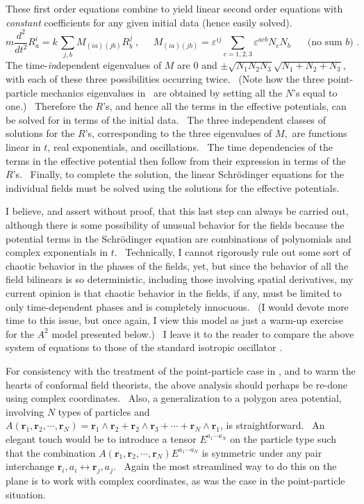 \documentclass[a4paper,12pt]{article}%
\begin{document}
These first order equations combine to yield linear second order equations
with \emph{constant} coefficients for any given initial data (hence easily
solved).%
\[
m\frac{d^{2}}{dt^{2}}R_{a}^{i}=k\,\sum_{j,b}M_{\left(  ia\right)  \left(
jb\right)  }R_{b}^{j}\;,\;\;\;\;\;M_{\left(  ia\right)  \left(  jb\right)
}=\varepsilon^{ij}\sum_{c=1,2,3}\varepsilon^{acb}N_{c}N_{b}%
\;\;\;\;\;\text{\ (no sum }b\text{)\ .}%
\]
The time-\emph{in}dependent eigenvalues of $M$ are $0$ and $\pm\sqrt
{N_{1}N_{2}N_{3}}\sqrt{N_{1}+N_{2}+N_{3}}$, with each of these three
possibilities occurring twice. \ (Note how the three point-particle mechanics
eigenvalues in \cite{CPZ}\ are obtained by setting all the $N$'s equal to
one.) \ Therefore the $R$'s, and hence all the terms in the effective
potentials, can be solved for in terms of the initial data. \ The three
independent classes of solutions for the $R$'s, corresponding to the three
eigenvalues of $M,$ are functions linear in $t$, real exponentials, and
oscillations. \ The time dependencies of the terms in the effective potential
then follow from their expression in terms of the $R$'s. \ Finally, to
complete the solution, the linear Schr\"{o}dinger equations for the individual
fields must be solved using the solutions for the effective potentials.

I believe, and assert without proof, that this last step can always be carried
out, although there is some possibility of unusual behavior for the fields
because the potential terms in the Schr\"{o}dinger equation are combinations
of polynomials and complex exponentials in $t$. \ Technically, I cannot
rigorously rule out some sort of chaotic behavior in the phases of the fields,
yet, but since the behavior of all the field bilinears is so deterministic,
including those involving spatial derivatives, my current opinion is that
chaotic behavior in the fields, if any, must be limited to only time-dependent
phases and is completely innocuous. \ (I would devote more time to this issue,
but once again, I view this model as just a warm-up exercise for the $A^{2}$
model presented below.) \ I leave it to the reader to compare the above system
of equations to those of the standard isotropic oscillator \cite{Lewis,Mahan}.

For consistency with the treatment of the point-particle case in \cite{CPZ},
and to warm the hearts of conformal field theorists, the above analysis should
perhaps be re-done using complex coordinates. \ Also, a generalization to a
polygon area potential, involving $N$ types of particles and $A\left(
\mathbf{r}_{1},\mathbf{r}_{2},\cdots,\mathbf{r}_{N}\right)  =\mathbf{r}%
_{1}\wedge\mathbf{r}_{2}+\mathbf{r}_{2}\wedge\mathbf{r}_{3}+\cdots
+\mathbf{r}_{N}\wedge\mathbf{r}_{1}$, is straightforward. \ An elegant touch
would be to introduce a tensor $E^{a_{1}\cdots a_{N}}$ on the particle type
such that the combination $A\left(  \mathbf{r}_{1},\mathbf{r}_{2}%
,\cdots,\mathbf{r}_{N}\right)  E^{a_{1}\cdots a_{N}}$ is symmetric under any
pair interchange $\mathbf{r}_{i},a_{i}\leftrightarrow\mathbf{r}_{j},a_{j}$.
\ Again the most streamlined way to do this on the plane is to work with
complex coordinates, as was the case in the point-particle situation.
\end{document}

